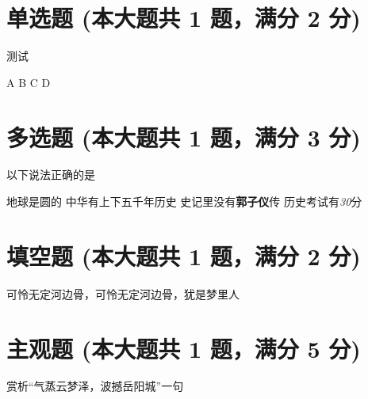 \documentclass[12pt, a4paper, addpoints]{exam}
\begin{document}
\begin{center}
\end{center}
\vspace{5mm}

\normalsize
\vspace{5mm}

\section{单选题 (本大题共 1 题，满分 2 分)}
\hspace{1.5cm}
\begin{questions}
\question[2] 测试

\begin{oneparchoices}
\choice A
\choice B
\choice C
\choice D
\end{oneparchoices}

\end{questions}

\hspace{5cm}

\section{多选题 (本大题共 1 题，满分 3 分)}
\hspace{1.5cm}
\begin{questions}
\question[3] 以下说法正确的是

\begin{checkboxes}
\choice 地球是圆的
\choice 中华有上下五千年历史
\choice 史记里没有\textbf{郭子仪}传
\choice 历史考试有\textit{30}分
\end{checkboxes}

\end{questions}

\hspace{5cm}

\section{填空题 (本大题共 1 题，满分 2 分)}
\hspace{1.5cm}
\begin{questions}
\question[2] 可怜无定河边骨，可怜无定河边骨，犹是\uline{\qquad\qquad\qquad\qquad}梦里人

\end{questions}

\hspace{5cm}

\section{主观题 (本大题共 1 题，满分 5 分)}
\hspace{1.5cm}
\begin{questions}
\question[5] 赏析“气蒸云梦泽，波撼岳阳城”一句


\end{questions}
\end{document}
